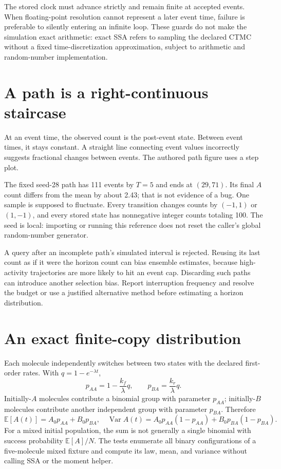 The stored clock must advance strictly and remain finite at accepted events.
When floating-point resolution cannot represent a later event time, failure is
preferable to silently entering an infinite loop. These guards do not make the
simulation exact arithmetic: exact SSA refers to sampling the declared CTMC
without a fixed time-discretization approximation, subject to arithmetic and
random-number implementation.

\section{A path is a right-continuous staircase}
At an event time, the observed count is the post-event state. Between event times,
it stays constant. A straight line connecting event values incorrectly suggests
fractional changes between events. The authored path figure uses a step plot.

The fixed seed-28 path has 111 events by $T=5$ and ends at $(29,71)$.
Its final $A$ count differs from the mean by about 2.43; that is not evidence of a
bug. One sample is supposed to fluctuate. Every transition changes counts by
$(-1,1)$ or $(1,-1)$, and every stored state has nonnegative integer counts totaling
100. The seed is local: importing or running this reference does not reset the
caller's global random-number generator.

A query after an incomplete path's simulated interval is rejected. Reusing its
last count as if it were the horizon count can bias ensemble estimates, because
high-activity trajectories are more likely to hit an event cap. Discarding such
paths can introduce another selection bias. Report interruption frequency and
resolve the budget or use a justified alternative method before estimating a
horizon distribution.

\section{An exact finite-copy distribution}
Each molecule independently switches between two states with the declared
first-order rates. With $q=1-e^{-\lambda t}$,
\[
p_{AA}=1-\frac{k_f}{\lambda}q,\qquad
p_{BA}=\frac{k_r}{\lambda}q.
\]
Initially-$A$ molecules contribute a binomial group with parameter $p_{AA}$;
initially-$B$ molecules contribute another independent group with parameter $p_{BA}$.
Therefore
\[
\mathbb E[A(t)]=A_0p_{AA}+B_0p_{BA},
\quad
\operatorname{Var}A(t)=A_0p_{AA}(1-p_{AA})+B_0p_{BA}(1-p_{BA}).
\]
For a mixed initial population, the sum is not generally a single binomial with
success probability $\mathbb E[A]/N$. The tests enumerate all binary configurations
of a five-molecule mixed fixture and compute its law, mean, and variance without
calling SSA or the moment helper.

